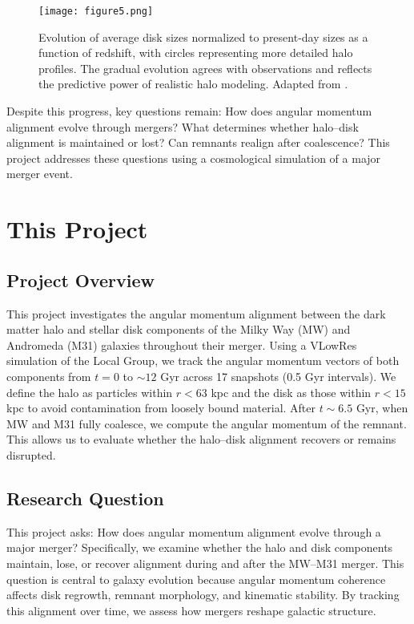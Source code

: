 \documentclass[twocolumn]{aastex631}
\begin{document}
\begin{figure}[H]
    \centering
    \texttt{[image: figure5.png]}
    \caption{Evolution of average disk sizes normalized to present-day sizes as a function of redshift, with circles representing more detailed halo profiles. The gradual evolution agrees with observations and reflects the predictive power of realistic halo modeling. Adapted from \citet{Somerville2008}.}
    \label{fig:somerville_fig5}
\end{figure}

Despite this progress, key questions remain: How does angular momentum alignment evolve through mergers? What determines whether halo–disk alignment is maintained or lost? Can remnants realign after coalescence? This project addresses these questions using a cosmological simulation of a major merger event.


\section{This Project}

\subsection{Project Overview}

This project investigates the angular momentum alignment between the dark matter halo and stellar disk components of the Milky Way (MW) and Andromeda (M31) galaxies throughout their merger. Using a VLowRes simulation of the Local Group, we track the angular momentum vectors of both components from $t = 0$ to $\sim12$ Gyr across 17 snapshots (0.5 Gyr intervals). We define the halo as particles within $r < 63$ kpc and the disk as those within $r < 15$ kpc to avoid contamination from loosely bound material. After $t \sim 6.5$ Gyr, when MW and M31 fully coalesce, we compute the angular momentum of the remnant. This allows us to evaluate whether the halo–disk alignment recovers or remains disrupted.

\subsection{Research Question}

This project asks: How does angular momentum alignment evolve through a major merger? Specifically, we examine whether the halo and disk components maintain, lose, or recover alignment during and after the MW–M31 merger. This question is central to galaxy evolution because angular momentum coherence affects disk regrowth, remnant morphology, and kinematic stability. By tracking this alignment over time, we assess how mergers reshape galactic structure.
\end{document}
